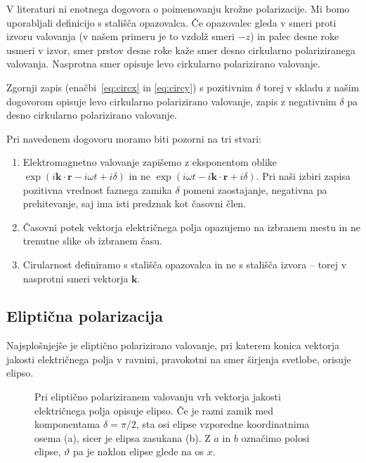 V literaturi ni enotnega dogovora o poimenovanju krožne polarizacije. 
Mi bomo uporabljali definicijo s stališča opazovalca.
Če opazovalec gleda v smeri proti izvoru valovanja (v našem primeru je 
to vzdolž smeri $-z$) in palec desne roke usmeri v izvor, smer prstov desne 
roke kaže smer desno cirkularno polariziranega valovanja. 
Nasprotna smer opisuje levo cirkularno polarizirano valovanje.

Zgornji zapis (enačbi~\ref{eq:circx} in \ref{eq:circy}) s pozitivnim
$\delta$ torej v skladu z našim dogovorom opisuje levo cirkularno 
polarizirano valovanje, zapis z negativnim $\delta$ pa desno 
cirkularno polarizirano valovanje. 

Pri navedenem dogovoru moramo biti pozorni na tri stvari:
\begin{enumerate}
 \item Elektromagnetno valovanje zapišemo z eksponentom oblike 
 $\exp(i\mathbf{k}\cdot \mathbf{r} - i\omega t + i\delta)$ in ne 
 $\exp(i\omega t -i\mathbf{k}\cdot \mathbf{r} + i\delta)$.
 Pri naši izbiri zapisa pozitivna vrednost faznega zamika $\delta$ pomeni 
 zaostajanje, negativna pa prehitevanje, saj ima isti predznak kot časovni člen. 
 \item Časovni potek vektorja električnega polja opazujemo na izbranem mestu 
 in ne trenutne slike ob izbranem času.
 \item Cirularnost definiramo s stališča opazovalca in ne s stališča 
 izvora -- torej v nasprotni smeri vektorja $\mathbf{k}$.
 \end{enumerate}

\subsection*{Eliptična polarizacija}
Najsplošnjejše je eliptično polarizirano valovanje, pri katerem 
konica vektorja jakosti električnega polja v ravnini, pravokotni
na smer širjenja svetlobe, orisuje elipso. 
\begin{figure}[h]
\centering
\def\svgwidth{120truemm} 

\caption{Pri eliptično polariziranem valovanju vrh vektorja
jakosti električnega polja opisuje elipso. Če je razni zamik med komponentama
$\delta = \pi/2$, sta osi elipse vzporedne koordinatnima osema (a), sicer
je elipsa zasukana (b). Z $a$ in $b$ označimo polosi elipse, $\vartheta$ pa je
naklon elipse glede na os $x$.}
\label{fig:03_elipspol}
\end{figure}

